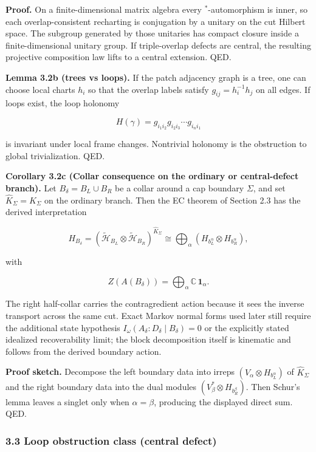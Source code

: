 \textbf{Proof.} On a finite-dimensional matrix algebra every \(^*\)-automorphism is inner, so each overlap-consistent recharting is conjugation by a unitary on the cut Hilbert space. The subgroup generated by those unitaries has compact closure inside a finite-dimensional unitary group. If triple-overlap defects are central, the resulting projective composition law lifts to a central extension. QED.

\textbf{Lemma 3.2b (trees vs loops).} If the patch adjacency graph is a tree, one can choose local charts \(h_i\) so that the overlap labels satisfy \(g_{ij} = h_i^{-1} h_j\) on all edges. If loops exist, the loop holonomy

\[
H(\gamma) = g_{i_1 i_2} g_{i_2 i_3} \cdots g_{i_n i_1}
\]

is invariant under local frame changes. Nontrivial holonomy is the obstruction to global trivialization. QED.

\textbf{Corollary 3.2c (Collar consequence on the ordinary or central-defect branch).} Let \(B_\delta = B_L \cup B_R\) be a collar around a cap boundary \(\Sigma\), and set \(\widehat K_\Sigma = K_\Sigma\) on the ordinary branch. Then the EC theorem of Section 2.3 has the derived interpretation

\[
H_{B_\delta}
=
(\tilde{\mathcal H}_{B_L}\otimes \tilde{\mathcal H}_{B_R})^{\widehat K_\Sigma}
\cong
\bigoplus_\alpha
(H_{b_L^\alpha}\otimes H_{b_R^\alpha}),
\]

with

\[
Z(A(B_\delta)) = \bigoplus_\alpha \mathbb C\,\mathbf 1_\alpha.
\]

The right half-collar carries the contragredient action because it sees the inverse transport across the same cut. Exact Markov normal forms used later still require the additional state hypothesis \(I_\omega(A_\delta:D_\delta \mid B_\delta)=0\) or the explicitly stated idealized recoverability limit; the block decomposition itself is kinematic and follows from the derived boundary action.

\textbf{Proof sketch.} Decompose the left boundary data into irreps \((V_\alpha \otimes H_{b_L^\alpha})\) of \(\widehat K_\Sigma\) and the right boundary data into the dual modules \((V_\beta^* \otimes H_{b_R^\beta})\). Then Schur's lemma leaves a singlet only when \(\alpha=\beta\), producing the displayed direct sum. QED.

\subsubsection{3.3 Loop obstruction class (central defect)}\label{33-loop-obstruction-class-central-defect}

